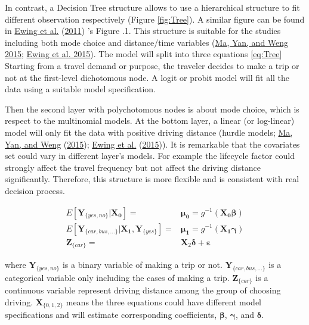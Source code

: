 \documentclass[
  11pt,
  openany]{memoir}
\begin{document}
In contrast, a Decision Tree structure allows to use a hierarchical structure to fit different observation respectively (Figure \ref{fig:Tree}). A similar figure can be found in \protect\hyperlink{ref-ewingTrafficGeneratedMixedUse2011}{Ewing et al.} (\protect\hyperlink{ref-ewingTrafficGeneratedMixedUse2011}{2011}) 's Figure .1.
This structure is suitable for the studies including both mode choice and distance/time variables (\protect\hyperlink{ref-maModelingTrafficCrash2015}{Ma, Yan, and Weng 2015}; \protect\hyperlink{ref-ewingVaryingInfluencesBuilt2015}{Ewing et al. 2015}).
The model will split into three equations \eqref{eq:Tree}
Starting from a travel demand or purpose, the traveler decides to make a trip or not at the first-level dichotomous node.
A logit or probit model will fit all the data using a suitable model specification.

Then the second layer with polychotomous nodes is about mode choice, which is respect to the multinomial models.
At the bottom layer, a linear (or log-linear) model will only fit the data with positive driving distance (hurdle models; \protect\hyperlink{ref-maModelingTrafficCrash2015}{Ma, Yan, and Weng} (\protect\hyperlink{ref-maModelingTrafficCrash2015}{2015}); \protect\hyperlink{ref-ewingVaryingInfluencesBuilt2015}{Ewing et al.} (\protect\hyperlink{ref-ewingVaryingInfluencesBuilt2015}{2015})).
It is remarkable that the covariates set could vary in different layer's models. For example the lifecycle factor could strongly affect the travel frequency but not affect the driving distance significantly.
Therefore, this structure is more flexible and is consistent with real decision process.

\begin{equation}
\begin{split}
E[\mathbf{Y}_{\{yes,no\}}|\mathbf{X_0}]=&\boldsymbol{\mu_0}=g^{-1}(\mathbf{X_0}\boldsymbol{\beta})\\
E[\mathbf{Y}_{\{car,bus,...\}}|\mathbf{X_1},\mathbf{Y}_{\{yes\}}]=&\boldsymbol{\mu_1}=g^{-1}(\mathbf{X_1}\boldsymbol{\gamma})\\
\mathbf{Z}_{\{car\}}=&\mathbf{X}_\mathrm{2}\boldsymbol{\delta} + \boldsymbol{\varepsilon}
\end{split}
\label{eq:Tree}
\end{equation}

where \(\mathbf{Y}_{\{yes,no\}}\) is a binary variable of making a trip or not. \(\mathbf{Y}_{\{car,bus,...\}}\) is a categorical variable only including the cases of making a trip. \(\mathbf{Z}_{\{car\}}\) is a continuous variable represent driving distance among the group of choosing driving. \(\mathbf{X}_{\{0,1,2\}}\) means the three equations could have different model specifications and will estimate corresponding coefficients, \(\boldsymbol{\beta}\), \(\boldsymbol{\gamma}\), and \(\boldsymbol{\delta}\).
\end{document}
